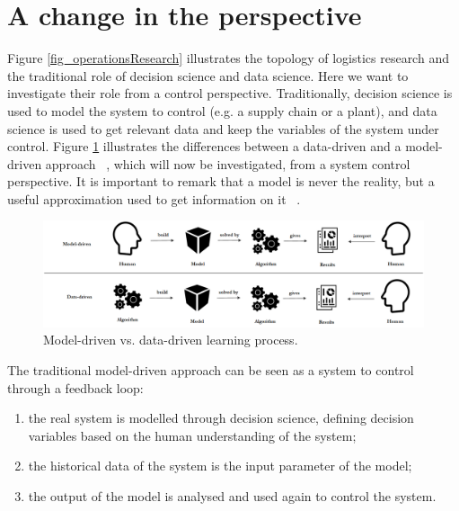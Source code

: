 \section{A change in the perspective}

Figure \ref{fig_operationsResearch} illustrates the topology of logistics research and the traditional role of decision science and data science. Here we want to investigate their role from a control perspective. Traditionally, decision science is used to model the system to control (e.g. a supply chain or a plant), and data science is used to get relevant data and keep the variables of the system under control. Figure \ref{fig_controlDataDriven} illustrates the differences between a data-driven and a model-driven approach ~\cite{Hedgebeth2007}, which will now be investigated, from a system control perspective. It is important to remark that a model is never the reality, but a useful approximation used to get information on it ~\cite{Hazen2014}.

\begin{figure}[hbt!]
\centering
\includegraphics[width=1\textwidth]{SectionIntroduction/introduction_figures/fig_controlDataDriven.png}
\captionsetup{type=figure}
\caption{Model-driven vs. data-driven learning process.}
\label{fig_controlDataDriven}
\end{figure}

The traditional model-driven approach can be seen as a system to control through a feedback loop:

\begin{enumerate}
    \item the real system is modelled through decision science, defining decision variables based on the human understanding of the system;
    \item the historical data of the system is the input parameter of the model;
    \item the output of the model is analysed and used again to control the system.

\end{enumerate}

